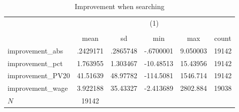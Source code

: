 \begin{table}[htbp]\centering
\def\sym#1{\ifmmode^{#1}\else\(^{#1}\)\fi}
\caption{Improvement when searching}
\begin{tabular}{l*{1}{ccccc}}
\hline\hline
            &\multicolumn{5}{c}{(1)}                                         \\
            &\multicolumn{5}{c}{}                                            \\
            &        mean&          sd&         min&         max&       count\\
\hline
improvement\_abs&    .2429171&    .2865748&   -.6700001&    9.050003&       19142\\
improvement\_pct&    1.763955&    1.303467&   -10.48513&    15.43956&       19142\\
improvement\_PV20&    41.51639&    48.97782&   -114.5081&    1546.714&       19142\\
improvement\_wage&    3.922188&    35.43327&   -2.413689&    2802.884&       19038\\
\hline
\(N\)       &       19142&            &            &            &            \\
\hline\hline
\end{tabular}
\end{table}
